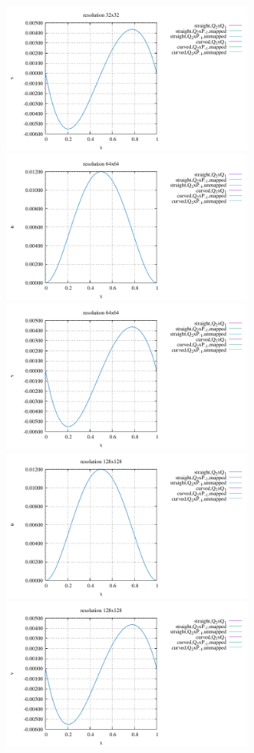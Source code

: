 \begin{center}
\includegraphics[width=8cm]{python_codes/fieldstone_25/results/doneahuerta/interface_v_32.pdf}\\
\includegraphics[width=8cm]{python_codes/fieldstone_25/results/doneahuerta/interface_u_64.pdf}
\includegraphics[width=8cm]{python_codes/fieldstone_25/results/doneahuerta/interface_v_64.pdf}\\
\includegraphics[width=8cm]{python_codes/fieldstone_25/results/doneahuerta/interface_u_128.pdf}
\includegraphics[width=8cm]{python_codes/fieldstone_25/results/doneahuerta/interface_v_128.pdf}\\
\end{center}

